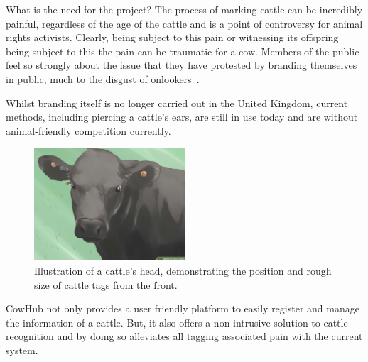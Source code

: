 
\begin{subsection}{What is the need for the project?}
  The process of marking cattle can be incredibly painful, regardless of the age of the cattle and is a point of controversy for animal rights activists. Clearly, being subject to this pain or witnessing its offspring being subject to this the pain can be traumatic for a cow. Members of the public feel so strongly about the issue that they have protested by branding themselves in public, much to the disgust of onlookers~\cite{theguardian1}.

  Whilst branding itself is no longer carried out in the United Kingdom, current methods, including piercing a cattle's ears, are still in use today and are without animal-friendly competition currently.

  \begin{figure}[H]
  	\centering
    \includegraphics[width=0.5\textwidth]{images/cattle-with-ear-tag.jpg}
  	\caption[Cattle ear tagging]{
      Illustration of a cattle's head, demonstrating the position and rough size of cattle tags from the front. \cite{wikihow1}
  	}
  \end{figure}

  CowHub not only provides a user friendly platform to easily register and manage the information of a cattle. But, it also offers a non-intrusive solution to cattle recognition and by doing so alleviates all tagging associated pain with the current system.

\end{subsection}

